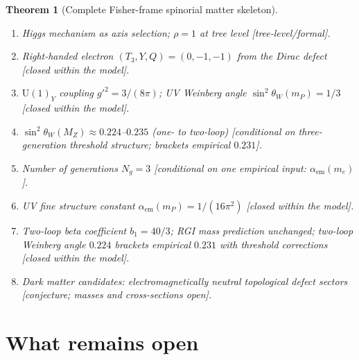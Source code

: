 \documentclass[12pt]{article}
\newtheorem{theorem}{Theorem}[section]
\theoremstyle{definition}
\theoremstyle{remark}
\begin{document}
\begin{theorem}[Complete Fisher-frame spinorial matter skeleton]
\begin{enumerate}
\item[(xiii)] Higgs mechanism as axis selection; $\rho=1$ at tree level
  \textnormal{[tree-level/formal]}.
\item[(xiv)] Right-handed electron $(T_3,Y,Q)=(0,-1,-1)$ from the Dirac defect
  \textnormal{[closed within the model]}.
\item[(xv)] $\mathrm{U}(1)_Y$ coupling $g'^2=3/(8\pi)$; UV Weinberg angle
  $\sin^2\theta_W(m_P)=1/3$
  \textnormal{[closed within the model]}.
\item[(xvi)] $\sin^2\theta_W(M_Z)\approx 0.224$--$0.235$ (one- to two-loop)
  \textnormal{[conditional on three-generation threshold structure; brackets
  empirical $0.231$]}.
\item[(xvii)] Number of generations $N_g=3$
  \textnormal{[conditional on one empirical input: $\alpha_{\mathrm{em}}(m_e)$]}.
\item[(xviii)] UV fine structure constant $\alpha_{\mathrm{em}}(m_P)=1/(16\pi^2)$
  \textnormal{[closed within the model]}.
\item[(xix)] Two-loop beta coefficient $b_1=40/3$; RGI mass prediction
  unchanged; two-loop Weinberg angle $0.224$ brackets empirical $0.231$ with
  threshold corrections \textnormal{[closed within the model]}.
\item[(xx)] Dark matter candidates: electromagnetically neutral topological
  defect sectors \textnormal{[conjecture; masses and cross-sections open]}.
\end{enumerate}
\end{theorem}

\section{What remains open}
\label{sec:open}
\end{document}
